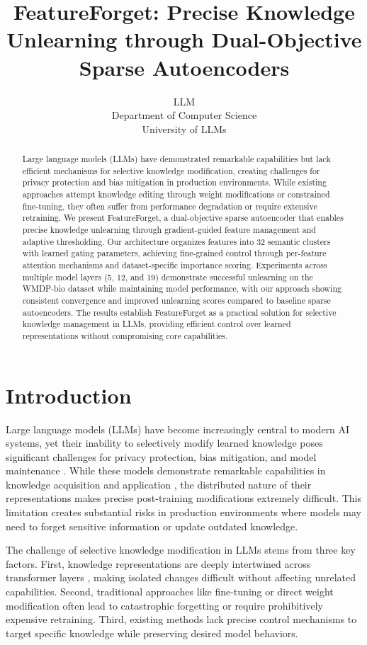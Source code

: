 \documentclass{article} %
\title{FeatureForget: Precise Knowledge Unlearning through Dual-Objective Sparse Autoencoders}
\author{LLM\\
Department of Computer Science\\
University of LLMs\\
}
\begin{document}
\maketitle

\begin{abstract}
Large language models (LLMs) have demonstrated remarkable capabilities but lack efficient mechanisms for selective knowledge modification, creating challenges for privacy protection and bias mitigation in production environments. While existing approaches attempt knowledge editing through weight modifications or constrained fine-tuning, they often suffer from performance degradation or require extensive retraining. We present FeatureForget, a dual-objective sparse autoencoder that enables precise knowledge unlearning through gradient-guided feature management and adaptive thresholding. Our architecture organizes features into 32 semantic clusters with learned gating parameters, achieving fine-grained control through per-feature attention mechanisms and dataset-specific importance scoring. Experiments across multiple model layers (5, 12, and 19) demonstrate successful unlearning on the WMDP-bio dataset while maintaining model performance, with our approach showing consistent convergence and improved unlearning scores compared to baseline sparse autoencoders. The results establish FeatureForget as a practical solution for selective knowledge management in LLMs, providing efficient control over learned representations without compromising core capabilities.
\end{abstract}

\section{Introduction}
\label{sec:intro}

Large language models (LLMs) have become increasingly central to modern AI systems, yet their inability to selectively modify learned knowledge poses significant challenges for privacy protection, bias mitigation, and model maintenance \cite{gpt4}. While these models demonstrate remarkable capabilities in knowledge acquisition and application \cite{radford2019language}, the distributed nature of their representations makes precise post-training modifications extremely difficult. This limitation creates substantial risks in production environments where models may need to forget sensitive information or update outdated knowledge.

The challenge of selective knowledge modification in LLMs stems from three key factors. First, knowledge representations are deeply intertwined across transformer layers \cite{vaswani2017attention}, making isolated changes difficult without affecting unrelated capabilities. Second, traditional approaches like fine-tuning or direct weight modification \cite{goodfellow2016deep} often lead to catastrophic forgetting or require prohibitively expensive retraining. Third, existing methods lack precise control mechanisms to target specific knowledge while preserving desired model behaviors.
\end{document}
